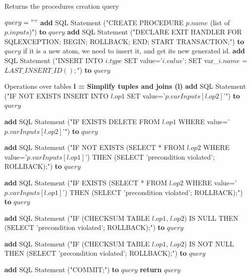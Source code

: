 \documentclass[oneside]{book}
\begin{document}
\begin{algorithm}
\caption{Returns the procedures creation query}
\label{array-sum3}
\begin{algorithmic}[1]
	\State $query = ""$
	\State \textbf{add} SQL Statement ("CREATE PROCEDURE $p.name$ (list of $p.inputs$)") \textbf{to} $query$
	\State \textbf{add} SQL Statement ("DECLARE EXIT HANDLER FOR SQLEXCEPTION; BEGIN; ROLLBACK; END; START TRANSACTION;") \textbf{to} $query$
		 \Comment if it is a new atom, we need to insert it, and get its new generated id.
			 \State \textbf{add} SQL Statement ("INSERT INTO $i.type$ SET value='$i.value$'; SET var\_$i.name$ = $LAST\_INSERT\_ID();$") \textbf{to} $query$
			\EndIf
		\EndFor
		
		 \Comment Operations over tables
			\State \textbf{l = Simplify tuples and joins (l)}
			 \State \textbf{add} SQL Statement ("IF NOT EXISTS INSERT INTO $l.op1$ SET value='$p.varInputs[l.op2]$'") \textbf{to} $query$
			
			 \State \textbf{add} SQL Statement ("IF EXISTS DELETE FROM $l.op1$ WHERE value='$p.varInputs[l.op2]$'") \textbf{to} $query$
			
			 \State \textbf{add} SQL Statement ("IF NOT EXISTS (SELECT * FROM $l.op2$ WHERE value='$p.varInputs[l.op1]$') THEN (SELECT 'precondition violated'; ROLLBACK);") \textbf{to} $query$
			
			 \State \textbf{add} SQL Statement ("IF EXISTS (SELECT * FROM $l.op2$ WHERE value='$p.varInputs[l.op1]$') THEN (SELECT 'precondition violated'; ROLLBACK);") \textbf{to} $query$
			
			 \State \textbf{add} SQL Statement ("IF (CHECKSUM TABLE $l.op1$, $l.op2$) IS NULL THEN (SELECT 'precondition violated'; ROLLBACK);") \textbf{to} $query$
			
			 \State \textbf{add} SQL Statement ("IF (CHECKSUM TABLE $l.op1$, $l.op2$) IS NOT NULL THEN (SELECT 'precondition violated'; ROLLBACK);") \textbf{to} $query$
			
			\EndIf
		\EndFor

	\State \textbf{add} SQL Statement ("COMMIT;") \textbf{to} $query$
	\EndFor
	\State \textbf{return} $query$
\EndFunction
\end{algorithmic}
\end{algorithm}
\end{document}
